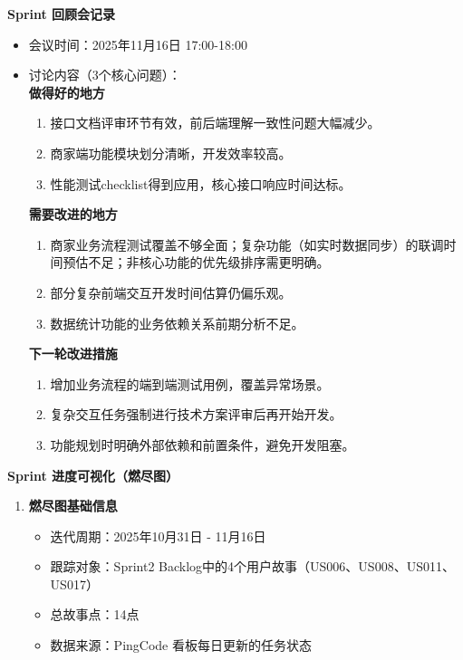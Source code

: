 \begin{levellist}
    \item \textbf{Sprint 回顾会记录}
    \begin{itemize}
        \item 会议时间：2025年11月16日 17:00-18:00
        \item 讨论内容（3个核心问题）：\\
              \textbf{做得好的地方}
              \begin{enumerate}
                  \item 接口文档评审环节有效，前后端理解一致性问题大幅减少。
                  \item 商家端功能模块划分清晰，开发效率较高。
                  \item 性能测试checklist得到应用，核心接口响应时间达标。
              \end{enumerate}
              \textbf{需要改进的地方}
              \begin{enumerate}
                  \item 商家业务流程测试覆盖不够全面；复杂功能（如实时数据同步）的联调时间预估不足；非核心功能的优先级排序需更明确。
                  \item 部分复杂前端交互开发时间估算仍偏乐观。
                  \item 数据统计功能的业务依赖关系前期分析不足。
              \end{enumerate}
              \textbf{下一轮改进措施}
              \begin{enumerate}
                  \item 增加业务流程的端到端测试用例，覆盖异常场景。
                  \item 复杂交互任务强制进行技术方案评审后再开始开发。
                  \item 功能规划时明确外部依赖和前置条件，避免开发阻塞。
              \end{enumerate}
    \end{itemize}

    \item \textbf{Sprint 进度可视化（燃尽图）}
    \begin{enumerate}
        \item \textbf{燃尽图基础信息}
              \begin{itemize}
                  \item 迭代周期：2025年10月31日 - 11月16日
                  \item 跟踪对象：Sprint2 Backlog中的4个用户故事（US006、US008、US011、US017）
                  \item 总故事点：14点
                  \item 数据来源：PingCode 看板每日更新的任务状态
              \end{itemize}


\end{enumerate}
\end{levellist}
